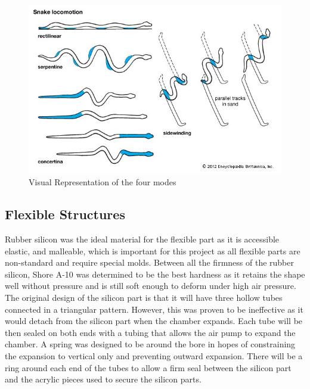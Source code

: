 \documentclass[twoside]{article}
\begin{document}
\begin{figure}[H]
\centering
\includegraphics[width=0.75\linewidth]{snake-motion}
\caption{Visual Representation of the four modes}
\end{figure}


\subsection{Flexible Structures}
Rubber silicon was the ideal material for the flexible part as it is accessible elastic, and malleable, which is important for this project as all flexible parts are non-standard and require special molds. Between all the firmness of the rubber silicon, Shore A-10 was determined to be the best hardness as it retains the shape well without pressure and is still soft enough to deform under high air pressure. The original design of the silicon part is that it will have three hollow tubes connected in a triangular pattern. However, this was proven to be ineffective as it would detach from the silicon part when the chamber expands. Each tube will be then sealed on both ends with a tubing that allows the air pump to expand the chamber. A spring was designed to be around the bore in hopes of constraining the expansion to vertical only and preventing outward expansion. There will be a ring around each end of the tubes to allow a firm seal between the silicon part and the acrylic pieces used to secure the silicon parts.  
\end{document}
